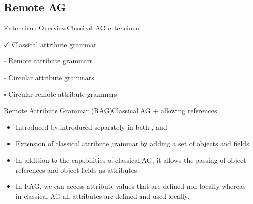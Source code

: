 \subsection*{Remote AG}{}

\begin{frame}{Extensions Overview}{Classical AG extensions}
     \begin{description}
        \item $\checkmark$ Classical attribute grammar
        \item $\square$  \alert{Remote attribute grammars}
        \item $\square$  Circular attribute grammars
        \item $\square$  Circular remote attribute grammars
    \end{description}
\end{frame}



% 
\begin{frame}{Remote Attribute Grammar (RAG)}{Classical AG + allowing references}

\begin{itemize}
    \item Introduced by introduced separately in both \cite{Boyland_1995, Boyland05remoteattribute},  and \cite{4236994589494506a212280893694207}
    \item Extension of classical attribute grammar by adding a set of \alert{objects} and \alert{fields}
    \item In addition to the capabilities of classical AG, it allows the passing of object references and object fields as attributes.
    \item In RAG, we can access attribute values that are defined \alert{non-locally} whereas in classical AG all attributes are defined and used \alert{locally}.
\end{itemize}


\end{frame}







